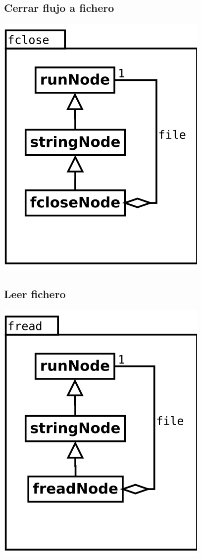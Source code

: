 \subsection {Cerrar flujo a fichero} 
\begin{center}
\includegraphics[scale=0.4]{fclose.png} \\
\end{center}

\subsection {Leer fichero} 
\begin{center}
\includegraphics[scale=0.4]{fread.png} \\
\end{center}

